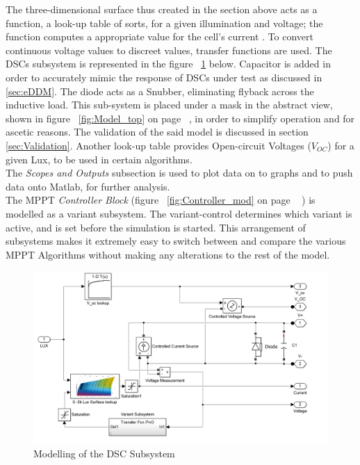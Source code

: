 The three-dimensional surface thus created in the section above acts as a function, a look-up table of sorts, for a given illumination and voltage; the function computes a appropriate value for the cell's current . To convert continuous voltage values to discreet values, transfer functions are used. The \ac{DSCs} subsystem is represented in the figure ~\ref{fig:PV_block_Model} below. Capacitor is added in order to accurately mimic the response of \ac{DSCs} under test as discussed in \ref{sec:eDDM}. The diode acts as a Snubber, eliminating flyback across the inductive load. This sub-system is placed under a mask in the abstract view, shown in figure ~\ref{fig:Model_top} on page ~\pageref{fig:Model_top}, in order to simplify operation and for ascetic reasons. The validation of the said model is discussed in section \ref{sec:Validation}. Another look-up table provides Open-circuit Voltages ($V_{OC}$) for a given Lux, to be used in certain algorithms. \\

The \textit{Scopes and Outputs} subsection is used to plot data on to graphs and to push data onto Matlab, for further analysis.\\

The \ac{MPPT} \textit{Controller Block} (figure ~\ref{fig:Controller_mod} on page ~\pageref{fig:Controller_mod} ) is modelled as a variant subsystem. The variant-control determines which variant is active, and is set before the simulation is started. This arrangement of subsystems makes it extremely easy to switch between and compare the various \ac{MPPT} Algorithms without making any alterations to the rest of the model.    

\begin{figure}[H]
	  \begin{center}
		  \includegraphics[width=\textwidth]{images/PV_block_Model}
		  \caption{Modelling of the DSC Subsystem }
		  \label{fig:PV_block_Model}
	  \end{center}
  \end{figure}

